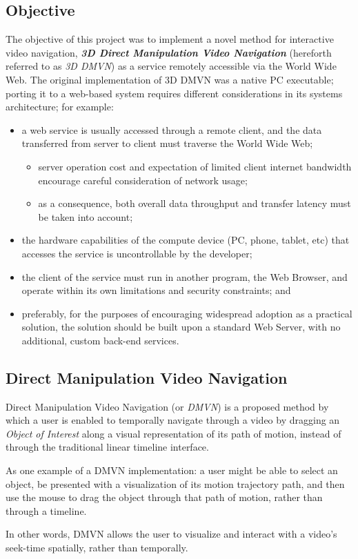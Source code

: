 \subsection{Objective}
The objective of this project was to implement a novel method for interactive video navigation, \textbf{\emph{3D Direct Manipulation Video Navigation}} \cite{dmvn3d} (hereforth referred to as \emph{3D DMVN}) as a service remotely accessible via the World Wide Web. The original implementation of 3D DMVN was a native PC executable; porting it to a web-based system requires different considerations in its systems architecture; for example:
\begin{itemize}
    \item a web service is usually accessed through a remote client, and the data transferred from server to client must traverse the World Wide Web;
    \begin{itemize}
        \item server operation cost and expectation of limited client internet bandwidth encourage careful consideration of network usage;
        \item as a consequence, both overall data throughput and transfer latency must be taken into account;
    \end{itemize}
    \item the hardware capabilities of the compute device (PC, phone, tablet, etc) that accesses the service is uncontrollable by the developer;
    \item the client of the service must run in another program, the Web Browser, and operate within its own limitations and security constraints; and
    \item preferably, for the purposes of encouraging widespread adoption as a practical solution, the solution should be built upon a standard Web Server, with no additional, custom back-end services.
\end{itemize}

\subsection{Direct Manipulation Video Navigation}
Direct Manipulation Video Navigation (or \emph{DMVN}) is a proposed method by which a user is enabled to temporally navigate through a video by dragging an \emph{Object of Interest} along a visual representation of its path of motion, instead of through the traditional linear timeline interface. \cite{dmvn}
\par As one example of a DMVN implementation: a user might be able to select an object, be presented with a visualization of its motion trajectory path, and then use the mouse to drag the object through that path of motion, rather than through a timeline.\par
In other words, DMVN allows the user to visualize and interact with a video's seek-time spatially, rather than temporally.

